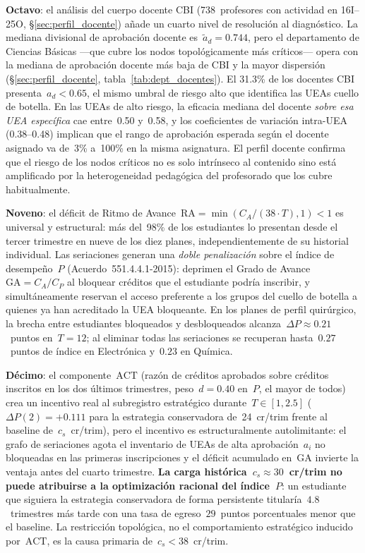 \documentclass[11pt,letterpaper]{article}
\begin{document}
\textbf{Octavo}: el análisis del cuerpo docente CBI (738~profesores con actividad
en 16I--25O, §\ref{sec:perfil_docente}) añade un cuarto nivel de resolución al
diagnóstico.
La mediana divisional de aprobación docente es~$\tilde{a}_d=0.744$, pero el
departamento de Ciencias Básicas ---que cubre los nodos topológicamente más
críticos--- opera con la mediana de aprobación docente más baja de CBI y la mayor
dispersión (\S\ref{sec:perfil_docente}, tabla~\ref{tab:dept_docentes}).
El 31.3\% de los docentes CBI presenta~$a_d<0.65$, el mismo umbral de riesgo
alto que identifica las UEAs cuello de botella.
En las UEAs de alto riesgo, la eficacia mediana del docente \emph{sobre esa UEA
específica} cae entre~0.50 y~0.58, y los coeficientes de variación
intra-UEA (0.38--0.48) implican que el rango de aprobación esperada según el
docente asignado va de~3\% a~100\% en la misma asignatura.
El perfil docente confirma que el riesgo de los nodos críticos no es solo
intrínseco al contenido sino está amplificado por la heterogeneidad pedagógica
del profesorado que los cubre habitualmente.

\textbf{Noveno}: el déficit de Ritmo de Avance~$\mathrm{RA}=\min(C_A/(38\cdot T),1)<1$
es universal y estructural: más del~98\% de los estudiantes lo presentan desde
el tercer trimestre en nueve de los diez planes, independientemente de su
historial individual.
Las seriaciones generan una \emph{doble penalización} sobre el índice de
desempeño~$P$ (Acuerdo~551.4.4.1-2015):
deprimen el Grado de Avance~$\mathrm{GA}=C_A/C_P$ al bloquear créditos que el
estudiante podría inscribir, y simultáneamente reservan el acceso preferente
a los grupos del cuello de botella a quienes ya han acreditado la UEA bloqueante.
En los planes de perfil quirúrgico, la brecha entre estudiantes bloqueados y
desbloqueados alcanza~$\Delta P\approx0.21$~puntos en~$T=12$; al eliminar todas
las seriaciones se recuperan hasta~$0.27$~puntos de índice en Electrónica
y~$0.23$ en Química.

\textbf{Décimo}: el componente~$\mathrm{ACT}$ (razón de créditos aprobados sobre
créditos inscritos en los dos últimos trimestres, peso~$d=0.40$ en~$P$, el mayor
de todos) crea un incentivo real al subregistro estratégico durante~$T\in[1,2.5]$
($\Delta P(2)=+0.111$ para la estrategia conservadora de~24~cr/trim frente al
baseline de~$c_s$~cr/trim), pero el incentivo es estructuralmente autolimitante:
el grafo de seriaciones agota el inventario de UEAs de alta aprobación~$a_i$ no
bloqueadas en las primeras inscripciones y el déficit acumulado en~$\mathrm{GA}$
invierte la ventaja antes del cuarto trimestre.
\textbf{La carga histórica~$c_s\approx30$~cr/trim no puede atribuirse a la
optimización racional del índice~$P$}: un estudiante que siguiera la estrategia
conservadora de forma persistente titularía~$4.8$~trimestres más tarde con una
tasa de egreso~$29$~puntos porcentuales menor que el baseline.
La restricción topológica, no el comportamiento estratégico inducido por~$\mathrm{ACT}$,
es la causa primaria de~$c_s<38$~cr/trim.
\end{document}
